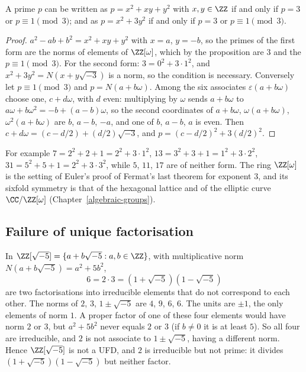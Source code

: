 \begin{corollary}\label{number-theory:corollary-eisenstein-primes}
A prime $p$ can be written as $p = x^2 + xy + y^2$ with $x, y \in \ZZ$ if and only if $p = 3$ or $p \equiv 1 \pmod 3$; and as $p = x^2 + 3y^2$ if and only if $p = 3$ or $p \equiv 1 \pmod 3$.
\end{corollary}

\begin{proof}
$a^2 - ab + b^2 = x^2 + xy + y^2$ with $x = a$, $y = -b$, so the primes of the first form are the norms of elements of $\ZZ[\omega]$, which by the proposition are $3$ and the $p \equiv 1 \pmod 3$. For the
second form: $3 = 0^2 + 3 \cdot 1^2$, and $x^2 + 3y^2 = N(x + y\sqrt{-3})$ is a norm, so the condition is necessary. Conversely let $p \equiv 1 \pmod 3$ and $p = N(a + b\omega)$. Among the six associates
$\varepsilon(a + b\omega)$ choose one, $c + d\omega$, with $d$ even: multiplying by $\omega$ sends $a + b\omega$ to $a\omega + b\omega^2 = -b + (a - b)\omega$, so the second coordinates of
$a + b\omega$, $\omega(a + b\omega)$, $\omega^2(a + b\omega)$ are $b$, $a - b$, $-a$, and one of $b$, $a - b$, $a$ is even. Then $c + d\omega = (c - d/2) + (d/2)\sqrt{-3}$, and
$p = (c - d/2)^2 + 3(d/2)^2$.
\end{proof}

For example $7 = 2^2 + 2 + 1 = 2^2 + 3 \cdot 1^2$, $13 = 3^2 + 3 + 1 = 1^2 + 3 \cdot 2^2$, $31 = 5^2 + 5 + 1 = 2^2 + 3 \cdot 3^2$, while $5$, $11$, $17$ are of neither form. The ring $\ZZ[\omega]$ is
the setting of Euler's proof of Fermat's last theorem for exponent $3$, and its sixfold symmetry is that of the hexagonal lattice and of the elliptic curve $\CC/\ZZ[\omega]$
(Chapter~\ref{algebraic-groups}).

\subsection{Failure of unique factorisation}\label{number-theory:subsection-failure-ufd}

\begin{example}\label{number-theory:example-sqrt-minus-five}
In $\ZZ[\sqrt{-5}] = \{a + b\sqrt{-5} : a, b \in \ZZ\}$, with multiplicative norm $N(a + b\sqrt{-5}) = a^2 + 5b^2$,
\[
6 = 2 \cdot 3 = (1 + \sqrt{-5})(1 - \sqrt{-5})
\]
are two factorisations into irreducible elements that do not correspond to each other. The norms of $2$, $3$, $1 \pm \sqrt{-5}$ are $4$, $9$, $6$, $6$. The units are $\pm1$, the only elements of norm $1$. A
proper factor of one of these four elements would have norm $2$ or $3$, but $a^2 + 5b^2$ never equals $2$ or $3$ (if $b \neq 0$ it is at least $5$). So all four are irreducible, and $2$ is not associate to
$1 \pm \sqrt{-5}$, having a different norm. Hence $\ZZ[\sqrt{-5}]$ is not a UFD, and $2$ is irreducible but not prime: it divides $(1 + \sqrt{-5})(1 - \sqrt{-5})$ but neither factor.
\end{example}

